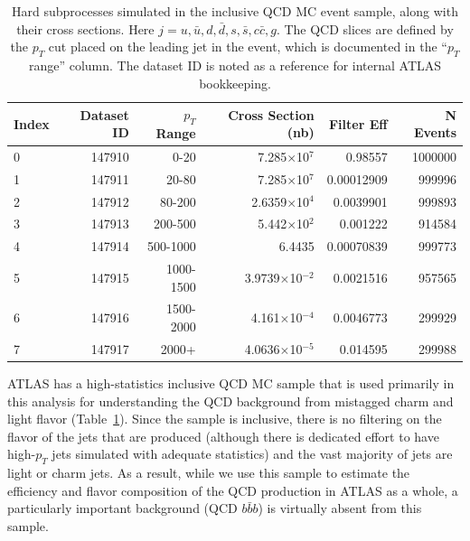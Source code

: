 \begin{table}[h]
 \begin{center}
\caption{Hard subprocesses simulated in the inclusive QCD MC event sample, along with their cross sections. Here
$j=u,\bar{u},d,\bar{d},s,\bar{s},c\bar{c},g$.  The QCD slices are defined by the $p_T$ cut placed
on the leading jet in the event, which is documented in the ``$p_T$ range'' column.  The dataset
ID is noted as a reference for internal ATLAS bookkeeping.
\label{tab:qcd_mc_parameters}}
    \begin{tabular}{l r r r r r} \hline \hline
    Index & Dataset ID & $p_T$ Range& Cross Section (nb)& Filter Eff   & N Events \\ \hline
    0     &  147910    & 0-20        &  7.285$\times$10$^7$    &   0.98557 & 1000000 \\
    1     &  147911    & 20-80       &  7.285$\times$10$^7$    &   0.00012909 & 999996  \\
    2     &  147912    & 80-200      &  2.6359$\times$10$^4$   &   0.0039901 & 999893 \\
    3     &  147913    & 200-500     &  5.442$\times$10$^2$    &     0.001222 & 914584 \\
    4     &  147914    & 500-1000    &  6.4435                 &   0.00070839 & 999773 \\
    5     &  147915    & 1000-1500   &  3.9739$\times$10$^{-2}$&    0.0021516 & 957565 \\
    6     &  147916    & 1500-2000   &  4.161$\times$10$^{-4}$ &    0.0046773 & 299929 \\
    7     &  147917    & 2000+       &  4.0636$\times$10$^{-5}$&     0.014595 & 299988 \\ \hline
    \end{tabular}
  \end{center}
\end{table}

ATLAS has a high-statistics inclusive QCD MC sample that is used primarily in 
this analysis for understanding the QCD background from 
mistagged charm and light flavor (Table~\ref{tab:qcd_mc_parameters}).  Since 
the sample is inclusive, there is no filtering on the flavor of the jets 
that are produced (although there is dedicated effort to have high-$p_T$ 
jets simulated with adequate statistics) and the vast majority of jets are light or 
charm jets.  As a result, while we use this sample to estimate the 
efficiency and flavor composition of the QCD production in ATLAS as a whole, a 
particularly important background (QCD $b\bar{b}b$) is virtually absent from this sample.


